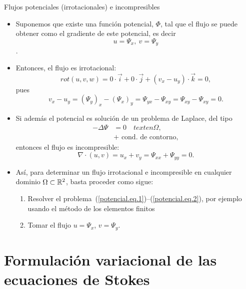 \documentclass[9pt, dvipsnames]{beamer}
\begin{document}
\begin{frame}{Flujos potenciales (irrotacionales) e incompresibles}
\begin{itemize}
\item Suponemos que existe una función potencial, $\Phi$, tal que
  el flujo se puede obtener como el gradiente de este potencial, es decir
  $$u=\Psi_x, \ v=\Psi_y$$.
  \item Entonces, el flujo es \alert{irrotacional}:
  $$
  rot(u,v,w) = 0\cdot \vec{i} + 0\cdot \vec j + (v_x - u_y)\cdot \vec k = 0,
  $$
  pues
  $$
  v_x - u_y= (\Psi_{y})_x - (\Psi_{x})_y = \Psi_{yx} - \Psi_{xy}= \Psi_{xy} - \Psi_{xy} =  0.
  $$
\item Si además el potencial es solución de un problema de Laplace, del tipo
  \begin{align}
    \label{potencial.eq.1}
    -\Delta \Psi &= 0 \quad text{ en } \Omega, \\
    \label{potencial.eq.2}
    &+ \text{ cond. de contorno},
  \end{align}
  entonces el flujo es \alert{incompresible}:
  $$
  \nabla\cdot(u,v) = u_x + v_y =\Psi_{xx} + \Psi_{yy} =  0.
  $$
\item Así, para determinar un flujo irrotacional e incompresible en
  cualquier dominio $\Omega\subset{\mathbb R}^2$, basta proceder como sigue:
  \begin{enumerate}
  \item Resolver el
    problema~(\ref{potencial.eq.1})--(\ref{potencial.eq.2}), por
    ejemplo usando el método de los elementos finitos
  \item Tomar el flujo $u=\Psi_x$, $v=\Psi_y$.
  \end{enumerate}


\end{itemize}

\end{frame}

\section{Formulación variacional de las ecuaciones de Stokes}
\end{document}
